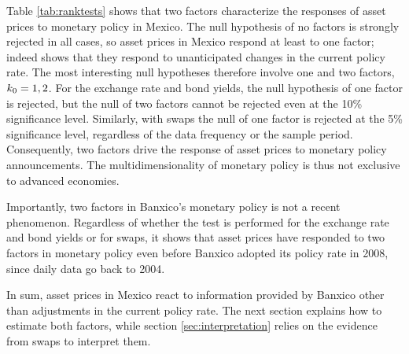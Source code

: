 {Table \ref{tab:ranktests} shows that two factors characterize the responses of asset prices to monetary policy in Mexico. The null hypothesis of no factors is strongly rejected in all cases, so asset prices in Mexico respond at least to one factor; \textcite{Solis:FX} indeed shows that they respond to unanticipated changes in the current policy rate. The most interesting null hypotheses therefore involve one and two factors, \(k_{0} = 1, 2\). 
For the exchange rate and bond yields, the null hypothesis of one factor is rejected, but the null of two factors cannot be rejected even at the 10\% significance level. 
Similarly, with swaps the null of one factor is rejected at the 5\% significance level, regardless of the data frequency or the sample period. 
Consequently, two factors drive the response of asset prices to monetary policy announcements. 
The multidimensionality of monetary policy \parencite{GSS:2005a, Altavillaetal:2019,Swanson:2021} is thus not exclusive to advanced economies. 


Importantly, two factors in Banxico's monetary policy is not a recent phenomenon. 
Regardless of whether the test is performed for the exchange rate and bond yields or for swaps, it shows that asset prices have responded to two factors in monetary policy even before Banxico adopted its policy rate in 2008, since daily data go back to 2004. 

In sum, asset prices in Mexico react to information provided by Banxico other than adjustments in the current policy rate. 
The next section explains how to estimate both factors, while section \ref{sec:interpretation} relies on the evidence from swaps to interpret them. %

}{}	%



